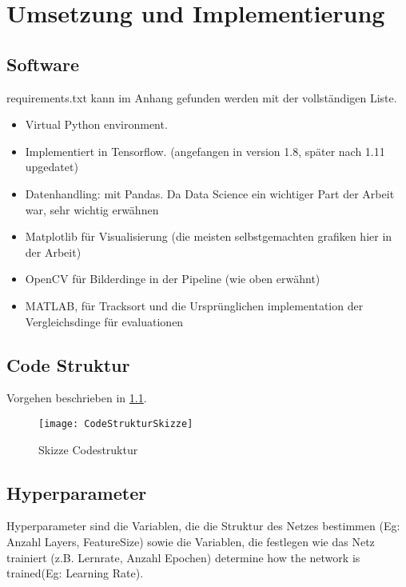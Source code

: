\chapter{Umsetzung und Implementierung}

\section{Software}

requirements.txt kann im Anhang gefunden werden mit der vollständigen Liste.

\begin{itemize}
    \item Virtual Python environment.
    \item Implementiert in Tensorflow. (angefangen in version 1.8, später nach 1.11 upgedatet)
    \item Datenhandling: mit Pandas. Da Data Science ein wichtiger Part der Arbeit war, sehr wichtig erwähnen
    \item Matplotlib für Visualisierung (die meisten selbstgemachten grafiken hier in der Arbeit)
    \item OpenCV für Bilderdinge in der Pipeline (wie oben erwähnt)
    \item MATLAB, für Tracksort und die Ursprünglichen implementation der Vergleichsdinge für evaluationen 
\end{itemize}


\section{Code Struktur}

Vorgehen beschrieben in \ref{CodeStruktur}.

\begin{figure}
    \centering
    \texttt{[image: CodeStrukturSkizze]}
    \caption{Skizze Codestruktur}
    \label{CodeStruktur}
\end{figure}
  

\section{Hyperparameter}

Hyperparameter sind die Variablen, die die Struktur des Netzes bestimmen (Eg: Anzahl Layers, FeatureSize) 
sowie die Variablen, die festlegen wie das Netz trainiert (z.B. Lernrate, Anzahl Epochen)
 determine how the network is trained(Eg: Learning Rate).

